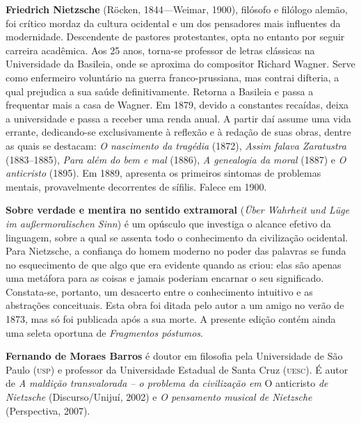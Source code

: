 \textbf{Friedrich Nietzsche} (Röcken, 1844---Weimar, 1900), filósofo 
e filólogo alemão, foi crítico mordaz da cultura ocidental 
e um dos pensadores mais influentes da modernidade. Descendente de pastores 
protestantes, opta no entanto por seguir carreira acadêmica. 
Aos 25 anos, torna-se professor de letras clássicas na Universidade 
da Basileia, onde se aproxima do compositor Richard Wagner. Serve 
como enfermeiro voluntário na guerra franco-prussiana, mas contrai 
difteria, a qual prejudica a sua saúde definitivamente. Retorna a 
Basileia e passa a frequentar mais a casa de Wagner. Em 
1879, devido a constantes recaídas, deixa a universidade e passa a 
receber uma renda anual. A partir daí assume uma vida errante, 
dedicando-se exclusivamente à reflexão e à redação de suas obras, 
dentre as quais se destacam: \textit{O nascimento da tragédia} (1872), 
\textit{Assim falava Zaratustra} (1883--1885), \textit{Para além do bem e mal} (1886), 
\textit{A genealogia da moral} (1887) e \textit{O anticristo} (1895). Em 1889, 
apresenta os primeiros sintomas de problemas mentais, provavelmente 
decorrentes de sífilis. Falece em 1900.

\textbf{Sobre verdade e mentira no sentido extramoral} (\textit{Über Wahrheit 
und Lüge im außermoralischen Sinn}) é um opúsculo que investiga 
o alcance efetivo da linguagem, sobre a qual se assenta todo o 
conhecimento da civilização ocidental. Para Nietzsche, a confiança do 
homem moderno no poder das palavras se funda no esquecimento de que 
algo que era evidente quando as criou: elas são apenas uma metáfora 
para as coisas e jamais poderiam encarnar o seu significado. 
Constata-se, portanto, um desacerto entre o conhecimento intuitivo 
e as abstrações conceituais. Esta obra foi ditada pelo autor a um amigo 
no verão de 1873, mas só foi publicada após a sua morte. A presente 
edição contém ainda uma seleta oportuna de \textit{Fragmentos póstumos}.

\textbf{Fernando de Moraes Barros} é doutor em filosofia pela Universidade 
de São Paulo (\textsc{usp}) e professor 
da Universidade Estadual de Santa Cruz 
(\textsc{uesc}). É autor de 
\textit{A maldição transvalorada -- o problema da civilização 
em} O anticristo \textit{de Nietzsche} (Discurso/Unijuí, 2002) 
e \textit{O pensamento 
musical de Nietzsche} (Perspectiva, 2007).

